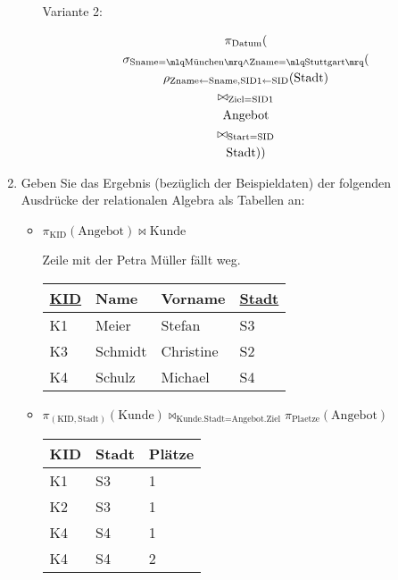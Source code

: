 \documentclass{lehramt-informatik}
\def\TmpUeber#1{{\setul{-0.9em}{}\ul{#1}}}
\begin{document}
\begin{enumerate}
\begin{itemize}
Variante 2:

\begin{antwort}
\begin{multline*}
\pi_{\text{Datum}}(\\
  \sigma_{
    \text{Sname} = \mlq\text{München}\mrq \land
    \text{Zname} = \mlq\text{Stuttgart}\mrq
  }(\\
    \rho_{
      \text{Zname} \leftarrow \text{Sname},
      \text{SID1} \leftarrow \text{SID}
    }(\text{Stadt})\\
    \bowtie_{\text{Ziel} = \text{SID1}}\\
    \text{Angebot}\\
    \bowtie_{\text{Start} = \text{SID}}\\
    \text{Stadt}
  )
)
\end{multline*}
\end{antwort}

%

\end{itemize}

\item Geben Sie das Ergebnis (bezüglich der Beispieldaten) der folgenden
Ausdrücke der relationalen Algebra als Tabellen an:

%

\begin{itemize}
\item $\pi_{\text{KID}} (\text{Angebot}) \bowtie \text{Kunde}$

\begin{antwort}
Zeile mit der Petra Müller fällt weg.

\begin{tabular}{|l|l|l|l|}
\hline
\ul{KID} & Name & Vorname & \TmpUeber{Stadt}\\\hline\hline
K1 & Meier & Stefan & S3\\\hline
K3 & Schmidt & Christine & S2\\\hline
K4 & Schulz & Michael & S4\\\hline
\end{tabular}
\end{antwort}

%

\item $
\pi_{(\text{KID},\text{Stadt})} (\text{Kunde})
\bowtie_{\text{Kunde.Stadt} = \text{Angebot.Ziel}}
\pi_{\text{Plaetze}} (\text{Angebot})$

\begin{antwort}

\begin{tabular}{|l|l|l|}
\hline
KID & Stadt & Plätze \\\hline\hline
K1 & S3 & 1 \\\hline
K2 & S3 & 1 \\\hline
K4 & S4 & 1 \\\hline
K4 & S4 & 2 \\\hline
\end{tabular}
\end{antwort}
\end{itemize}
\end{enumerate}

\literatur
\end{document}
